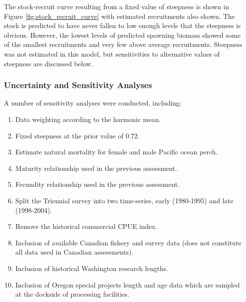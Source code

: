 \documentclass[12pt,]{article}
\begin{document}
The stock-recruit curve resulting from a fixed value of steepness is
shown in Figure \ref{fig:stock_recruit_curve} with estimated
recruitments also shown. The stock is predicted to have never fallen to
low enough levels that the steepness is obvious. However, the lowest
levels of predicted spawning biomass showed some of the smallest
recruitments and very few above average recruitments. Steepness was not
estimated in this model, but sensitivities to alternative values of
steepness are discussed below.

\subsubsection{Uncertainty and Sensitivity
Analyses}\label{uncertainty-and-sensitivity-analyses}

A number of sensitivity analyses were conducted, including:

\begin{enumerate}

  \item Data weighting according to the harmonic mean.
  
  \item Fixed steepness at the prior value of 0.72.
  
  \item Estimate natural mortality for female and male Pacific ocean perch.
  
  \item Maturity relationship used in the previous assessment.
  
  \item Fecundity relationship used in the previous assessment.
  
  \item Split the Triennial survey into two time-series, early (1980-1995) and late (1998-2004).
  
  \item Remove the historical commercial CPUE index.
  
  \item Inclusion of available Canadian fishery and survey data (does not constitute all data used in Canadian assessments).
  
  \item Inclusion of historical Washington research lengths.
  
  \item Inclusion of Oregon special projects length and age data which are sampled at the dockside of processing facilities.
  
\end{enumerate}
\end{document}
